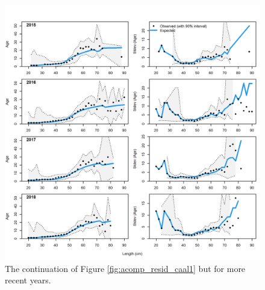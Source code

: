 \documentclass[11pt,
  english,
  a4paper,
]{article}
\begin{document}
\tagmcend\tagstructend


\begin{figure}
\centering
\includegraphics[width=1\textwidth,height=1\textheight]{figs/comp_condAALfit_Andre_plotsflt8mkt0_page4.png}
\caption{The continuation of Figure \ref{fig:acomp_resid_caal1} but for more recent years. \label{fig:acomp_resid_caal4}}
\end{figure}

\tagmcend\tagstructend

\end{document}
